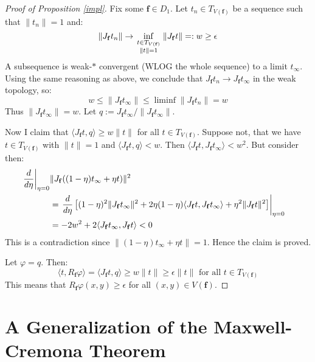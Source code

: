 \documentclass{amsart}
\newcommand{\f}			{\mathbf f}
\numberwithin{equation}{section}
\begin{document}
\begin{proof}[Proof of Proposition \ref{impl}]
Fix some $\f\in D_1$.  Let $t_n\in T_{V(\f)}$ be a 
sequence such that $\|t_n\|=1$ and:
\begin{equation}
\|J_\f t_n\|\to\inf_{\begin{smallmatrix}t\in T_{V(\f)}\cr\|t\|=1\end{smallmatrix}}\|J_\f t\|
=:w\geq\epsilon
\end{equation}
A subsequence is weak-$*$ convergent (WLOG the whole 
sequence) to a limit $t_{\infty}$.  Using the same reasoning 
as above, we conclude that $J_\f t_n\to J_\f t_{\infty}$ in 
the weak topology, so:
\begin{equation}
w\leq\|J_\f t_{\infty}\|\leq\liminf\|J_\f t_n\|=w
\end{equation}
Thus $\|J_\f t_{\infty}\|=w$.  Let $q:=J_\f t_{\infty}/\|J_\f t_{\infty}\|$.

Now I claim that $\langle J_\f t,q\rangle\geq w\|t\|$ 
for all $t\in T_{V(\f)}$.  Suppose not, that we have $t\in T_{V(\f)}$ 
with $\|t\|=1$ and $\langle J_\f t,q\rangle<w$.  
Then $\langle J_\f t,J_\f t_{\infty}\rangle<w^2$.  But 
consider then:
\begin{equation}
\begin{split}
\left.\frac d{d\eta}\right|_{\eta=0}
&\|J_\f((1-\eta)t_{\infty}+\eta t)\|^2\cr
&=\left.\frac d{d\eta}
\left[(1-\eta)^2\|J_\f t_{\infty}\|^2+2\eta(1-\eta)\langle J_\f t,J_\f t_{\infty}\rangle
+\eta^2 \|J_\f t\|^2\right]\right|_{\eta=0}\cr
&=-2w^2+2\langle J_\f t_{\infty}, J_\f t\rangle<0
\end{split}
\end{equation}
This is a contradiction since $\|(1-\eta)t_{\infty}+\eta t\|=1$.  
Hence the claim is proved.

Let $\varphi=q$.  Then:
\begin{equation}
\langle t,R_\f\varphi\rangle=\langle J_\f t,q\rangle\geq w\|t\|\geq\epsilon\|t\|
\text{ for all $t\in T_{V(\f)}$}
\end{equation}
This means that $R_\f\varphi(x,y)\geq\epsilon$ for all $(x,y)\in V(\f)$.
\end{proof}

\section{A Generalization of the Maxwell-Cremona Theorem}\label{maxwells}
\end{document}
